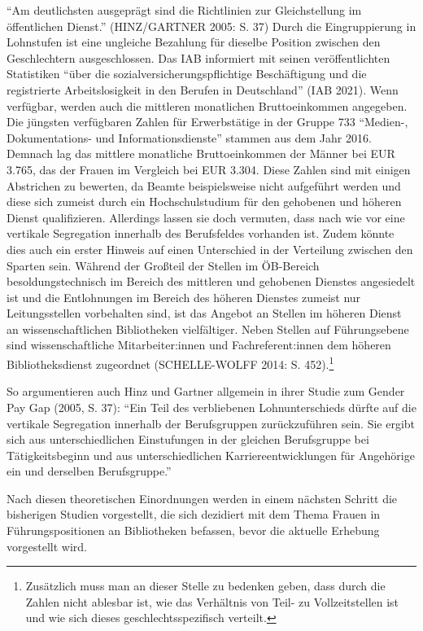 \documentclass[a4paper,
fontsize=11pt,
oneside,
numbers=noperiodatend,
parskip=half-,
bibliography=totoc,
final
]{scrartcl}
\begin{document}
\enquote{Am deutlichsten ausgeprägt sind die Richtlinien zur
Gleichstellung im öffentlichen Dienst.} (HINZ/GARTNER 2005: S. 37) Durch
die Eingruppierung in Lohnstufen ist eine ungleiche Bezahlung für
dieselbe Position zwischen den Geschlechtern ausgeschlossen. Das IAB
informiert mit seinen veröffentlichten Statistiken \enquote{über die
sozialversicherungspflichtige Beschäftigung und die registrierte
Arbeitslosigkeit in den Berufen in Deutschland} (IAB 2021). Wenn
verfügbar, werden auch die mittleren monatlichen Bruttoeinkommen
angegeben. Die jüngsten verfügbaren Zahlen für Erwerbstätige in der
Gruppe 733 \enquote{Medien-, Dokumentations- und Informationsdienste}
stammen aus dem Jahr 2016. Demnach lag das mittlere monatliche
Bruttoeinkommen der Männer bei EUR 3.765, das der Frauen im Vergleich
bei EUR 3.304. Diese Zahlen sind mit einigen Abstrichen zu bewerten, da
Beamte beispielsweise nicht aufgeführt werden und diese sich zumeist
durch ein Hochschulstudium für den gehobenen und höheren Dienst
qualifizieren. Allerdings lassen sie doch vermuten, dass nach wie vor
eine vertikale Segregation innerhalb des Berufsfeldes vorhanden ist.
Zudem könnte dies auch ein erster Hinweis auf einen Unterschied in der
Verteilung zwischen den Sparten sein. Während der Großteil der Stellen
im ÖB-Bereich besoldungstechnisch im Bereich des mittleren und gehobenen
Dienstes angesiedelt ist und die Entlohnungen im Bereich des höheren
Dienstes zumeist nur Leitungsstellen vorbehalten sind, ist das Angebot
an Stellen im höheren Dienst an wissenschaftlichen Bibliotheken vielfältiger. Neben Stellen auf
Führungsebene sind wissenschaftliche Mitarbeiter:innen und
Fachreferent:innen dem höheren Bibliotheksdienst zugeordnet
(SCHELLE-WOLFF 2014: S. 452).\footnote{Zusätzlich muss man an dieser
  Stelle zu bedenken geben, dass durch die Zahlen nicht ablesbar ist,
  wie das Verhältnis von Teil- zu Vollzeitstellen ist und wie sich
  dieses geschlechtsspezifisch verteilt.}

So argumentieren auch Hinz und Gartner allgemein in ihrer Studie zum
Gender Pay Gap (2005, S. 37): \enquote{Ein Teil des verbliebenen
Lohnunterschieds dürfte auf die vertikale Segregation innerhalb der
Berufsgruppen zurückzuführen sein. Sie ergibt sich aus unterschiedlichen
Einstufungen in der gleichen Berufsgruppe bei Tätigkeitsbeginn und aus
unterschiedlichen Karriereentwicklungen für Angehörige ein und derselben
Berufsgruppe.}

Nach diesen theoretischen Einordnungen werden in einem nächsten Schritt
die bisherigen Studien vorgestellt, die sich dezidiert mit dem Thema
Frauen in Führungspositionen an Bibliotheken befassen, bevor die
aktuelle Erhebung vorgestellt wird.
\end{document}
